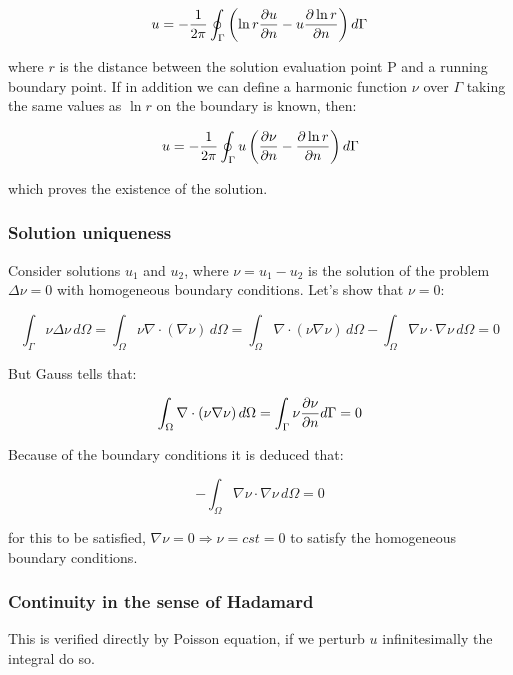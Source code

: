 \begin{equation}
u = - \frac{1}{2\pi} \oint _\Gamma \left( \ln r \frac{\partial u}{\partial n}- u\frac{\partial \ln r}{\partial n} \right) d\Gamma
\end{equation}

where $r$ is the distance between the solution evaluation point P and a running boundary point. If in addition we can define a harmonic function $\nu$ over $\Gamma$ taking the same values as $\ln r$ on the boundary is known, then: 

\begin{equation}
u = - \frac{1}{2\pi} \oint _\Gamma  u \left( \frac{\partial \nu}{\partial n} - \frac{\partial \ln r}{\partial n} \right)d\Gamma
\end{equation}

which proves the existence of the solution.

\subsubsection{Solution uniqueness}
Consider solutions $u_1$ and $u_2$, where $\nu = u_1 - u_2$ is the solution of the problem $\Delta \nu = 0$ with homogeneous boundary conditions. Let's show that $\nu = 0$: 

\begin{equation}
\int _\Gamma \nu \Delta \nu \, d\Omega = \int _\Omega \nu \nabla \cdot (\nabla \nu) \,d\Omega = \int _\Omega \nabla \cdot (\nu \nabla \nu) \,d\Omega - \int _\Omega \nabla \nu \cdot \nabla \nu \,d\Omega = 0
\end{equation} 

But Gauss tells that: 

\begin{equation}
\int _\Omega \nabla\cdot (\nu \nabla \nu) \, d\Omega = \int _\Gamma \nu \frac{\partial \nu}{\partial n} d\Gamma= 0 
\end{equation}

Because of the boundary conditions it is deduced that: 

\begin{equation}
- \int _\Omega \nabla \nu \cdot \nabla \nu \, d\Omega = 0
\end{equation}

for this to be satisfied, $\nabla \nu = 0 \Rightarrow \nu = cst = 0$ to satisfy the homogeneous boundary conditions. 

\subsubsection{Continuity in the sense of Hadamard}
This is verified directly by Poisson equation, if we perturb $u$ infinitesimally the integral do so. 

